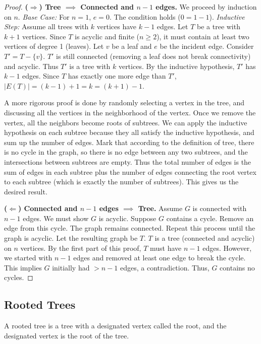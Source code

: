 \begin{proof}
\textbf{($\Rightarrow$) Tree $\implies$ Connected and $n-1$ edges.}
We proceed by induction on $n$.
\textit{Base Case:} For $n=1$, $e=0$. The condition holds ($0 = 1-1$).
\textit{Inductive Step:} Assume all trees with $k$ vertices have $k-1$ edges. Let $T$ be a tree with $k+1$ vertices.
Since $T$ is acyclic and finite ($n \ge 2$), it must contain at least two vertices of degree 1 (leaves). Let $v$ be a leaf and $e$ be the incident edge.
Consider $T' = T - \{v\}$. $T'$ is still connected (removing a leaf does not break connectivity) and acyclic. Thus $T'$ is a tree with $k$ vertices.
By the inductive hypothesis, $T'$ has $k-1$ edges. Since $T$ has exactly one more edge than $T'$, $|E(T)| = (k-1) + 1 = k = (k+1)-1$.

A more rigorous proof is done by randomly selecting a vertex in the tree, and discussing all the vertices in the neighborhood of the vertex. Once we remove the vertex, all the neighbors become roots of subtrees. We can apply the inductive hypothesis on each subtree because they all satisfy the inductive hypothesis, and sum up the number of edges. Mark that according to the definition of tree, there is no cycle in the graph, so there is no edge between any two subtrees, and the intersections between subtrees are empty. Thus the total number of edges is the sum of edges in each subtree plus the number of edges connecting the root vertex to each subtree (which is exactly the number of subtrees). This gives us the desired result.

\textbf{($\Leftarrow$) Connected and $n-1$ edges $\implies$ Tree.}
Assume $G$ is connected with $n-1$ edges. We must show $G$ is acyclic.
Suppose $G$ contains a cycle. Remove an edge from this cycle. The graph remains connected. Repeat this process until the graph is acyclic. Let the resulting graph be $T$.
$T$ is a tree (connected and acyclic) on $n$ vertices. By the first part of this proof, $T$ must have $n-1$ edges.
However, we started with $n-1$ edges and removed at least one edge to break the cycle. This implies $G$ initially had $> n-1$ edges, a contradiction. Thus, $G$ contains no cycles.
\end{proof}

\subsection{Rooted Trees}

\begin{definition}
A rooted tree is a tree with a designated vertex called the root, and the designated vertex is the root of the tree.
\end{definition}

